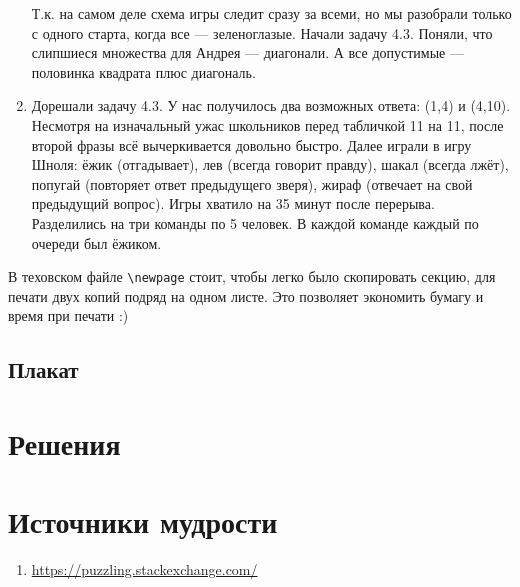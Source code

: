 \documentclass[12pt]{article}
\newcounter{problem}[section]
\theoremstyle{definition}
\begin{document}
\begin{enumerate}
  Т.к. на самом деле схема игры следит сразу за всеми, но мы разобрали только с одного старта, когда все — зеленоглазые.
  Начали задачу 4.3. Поняли, что слипшиеся множества для Андрея — диагонали. А все допустимые — половинка квадрата плюс диагональ. 
  \item Дорешали задачу 4.3. У нас получилось два возможных ответа: (1,4) и (4,10). Несмотря на изначальный ужас школьников перед табличкой 11 на 11,
  после второй фразы всё вычеркивается довольно быстро. Далее играли в игру Шноля: ёжик (отгадывает), лев (всегда говорит правду),
  шакал (всегда лжёт), попугай (повторяет ответ предыдущего зверя), жираф (отвечает на свой предыдущий вопрос). Игры хватило на 35 минут после перерыва.
  Разделились на три команды по 5 человек. В каждой команде каждый по очереди был ёжиком. 
\end{enumerate}

В теховском файле \verb|\newpage| стоит, чтобы легко было скопировать секцию, для печати двух копий подряд на одном листе.
Это позволяет экономить бумагу и время при печати :)

\subsection{Плакат}






\renewenvironment{solution}[1]{%
         \vskip .5cm plus 2cm minus 0.1cm%
         {\bfseries \hyperlink{problem:#1}{#1.}}%
}%
{%
}%



\section{Решения}



\section{Источники мудрости}


\begin{enumerate}
\item \url{https://puzzling.stackexchange.com/}
\end{enumerate}

\printbibliography[heading=none]
\end{document}
